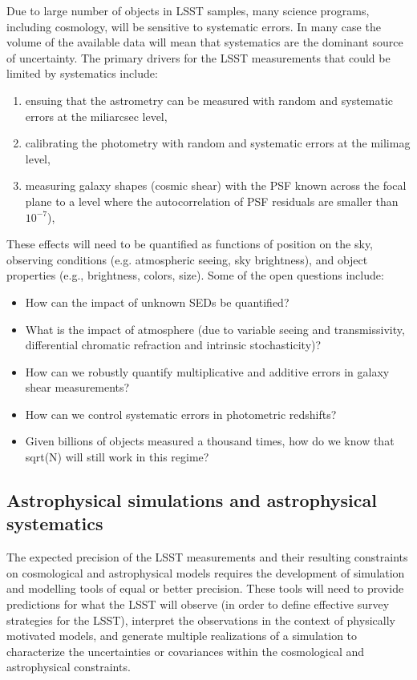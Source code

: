 \documentclass{iau}
\begin{document}
Due to large number of objects in LSST samples, many science programs, including cosmology,
will be sensitive to systematic errors. In many case the volume of the
available data will mean that systematics are the dominant source of
uncertainty. The primary drivers for the LSST measurements that could
be limited by systematics include:
\begin{enumerate}
\item ensuing that the astrometry can be measured with random and systematic errors at the miliarcsec level,
\item calibrating the photometry with random and systematic errors at the milimag level,
\item measuring galaxy shapes (cosmic shear) with the PSF known across
  the focal plane to a level where the autocorrelation of PSF
  residuals are smaller than $10^{-7}$),
\end{enumerate}
These effects will need to be quantified as functions of position on the sky, observing 
conditions (e.g. atmospheric seeing, sky brightness), and object properties
(e.g., brightness, colors, size). Some of the open questions include:
\begin{itemize}
\item How can the impact of unknown SEDs be quantified? 
\item What is the impact of atmosphere (due to variable seeing and transmissivity, 
          differential chromatic refraction and intrinsic stochasticity)? 
\item How can we robustly quantify multiplicative and additive errors in galaxy shear measurements? 
\item How can we control systematic errors in photometric redshifts? 
\item Given billions of objects measured a thousand times, how do we know that sqrt(N) will still work
          in this regime? 
\end{itemize}



\subsection{Astrophysical simulations and astrophysical systematics}

The expected precision of the LSST measurements and their resulting
constraints on cosmological and astrophysical models requires the
development of simulation and modelling tools of equal or better
precision. These tools will need to provide predictions for what the LSST
will observe (in order to define effective survey strategies for the
LSST),  interpret the observations in the context of physically
motivated models, and generate multiple realizations of a simulation
to characterize the uncertainties or covariances within the
cosmological and astrophysical constraints.
\end{document}
